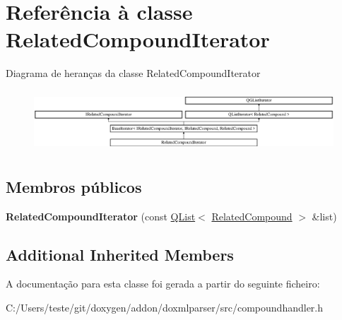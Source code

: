 \hypertarget{class_related_compound_iterator}{\section{Referência à classe Related\-Compound\-Iterator}
\label{class_related_compound_iterator}
}
Diagrama de heranças da classe Related\-Compound\-Iterator\begin{figure}[H]
\begin{center}
\leavevmode
\includegraphics[height=2.323651cm]{class_related_compound_iterator}
\end{center}
\end{figure}
\subsection*{Membros públicos}
\begin{DoxyCompactItemize}
\item 
\hypertarget{class_related_compound_iterator_a1b01b754fc2ec4b5affaf63f2c0bca05}{{\bfseries Related\-Compound\-Iterator} (const \hyperlink{class_q_list}{Q\-List}$<$ \hyperlink{class_related_compound}{Related\-Compound} $>$ \&list)}\label{class_related_compound_iterator_a1b01b754fc2ec4b5affaf63f2c0bca05}

\end{DoxyCompactItemize}
\subsection*{Additional Inherited Members}


A documentação para esta classe foi gerada a partir do seguinte ficheiro\-:\begin{DoxyCompactItemize}
\item 
C\-:/\-Users/teste/git/doxygen/addon/doxmlparser/src/compoundhandler.\-h\end{DoxyCompactItemize}
